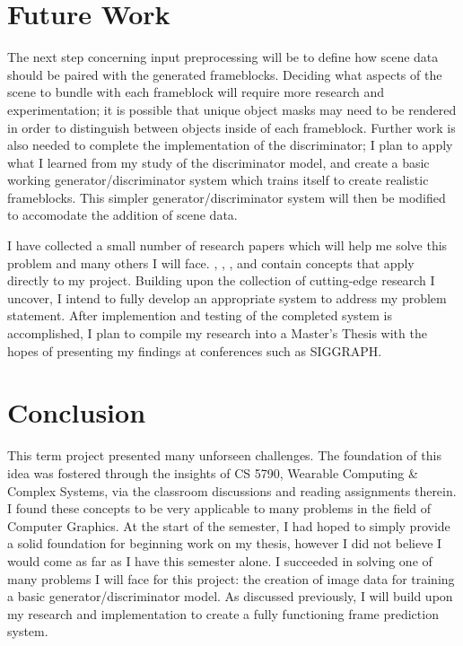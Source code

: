 \documentclass[conference]{IEEEtran}
\begin{document}
\section{Future Work}
\label{sec:future_work}
The next step concerning input preprocessing will be to define how
scene data should be paired with the generated frameblocks.
Deciding what aspects of the scene to bundle with each
frameblock will require more research and experimentation;
it is possible that unique object masks may need to be rendered in order to
distinguish between objects inside of each frameblock.
Further work is also needed to complete the implementation of the discriminator;
I plan to apply what I learned from my study of the discriminator model, and
create a basic working generator/discriminator system which trains itself to
create realistic frameblocks. This simpler generator/discriminator system will
then be modified to accomodate the addition of scene data.

I have collected a small number of research papers which will help me solve this
problem and many others I will face.
\cite{ref:frame_prediction},
\cite{ref:spatiotemporal}, \cite{ref:posecnn}, and \cite{ref:pose_guided}
contain concepts that apply directly to my project.
Building upon the collection of cutting-edge research I uncover,
I intend to fully develop an appropriate system to address my problem statement.
After implemention and testing of the completed system is
accomplished, I plan to compile my research into a Master's Thesis with the
hopes of presenting my findings at conferences such as SIGGRAPH.

\section{Conclusion}
\label{sec:conclusion}
This term project presented many unforseen challenges. The foundation of this
idea was fostered
through the insights of CS 5790, Wearable Computing \& Complex Systems, via the
classroom discussions and reading assignments therein. I found these concepts to
be very applicable to many problems in the field
of Computer Graphics. At the start of the semester, I had hoped to simply provide a solid foundation
for beginning work on my thesis, however I did not believe I would come as far
as I have this semester alone. I succeeded in solving one of many problems I
will face for this project: the creation of image data for training a
basic generator/discriminator model. As discussed previously, I will build upon my
research and implementation to create a fully functioning frame prediction system.
\end{document}
